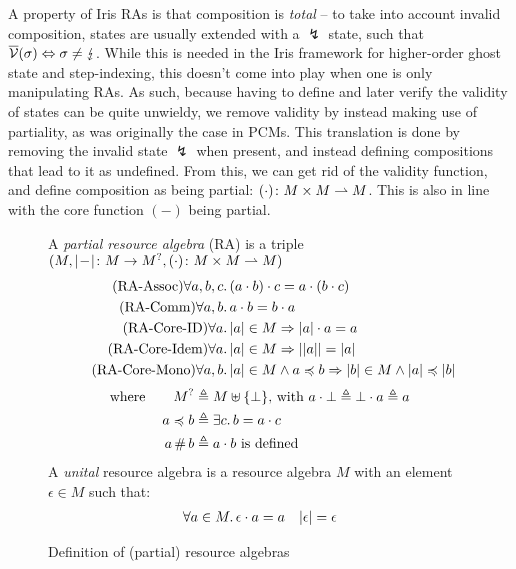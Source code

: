A property of Iris RAs is that composition is \emph{total} -- to take into account invalid composition, states are usually extended with a $\lightning$ state, such that $\overline{\cal V}(\sigma)\Leftrightarrow \sigma\neq\lightning$. While this is needed in the Iris framework for higher-order ghost state and step-indexing, this doesn't come into play when one is only manipulating RAs. As such, because having to define and later verify the validity of states can be quite unwieldy, we remove validity by instead making use of partiality, as was originally the case in PCMs. This translation is done by removing the invalid state $\lightning$ when present, and instead defining compositions that lead to it as undefined. From this, we can get rid of the validity function, and define composition as being partial: $(\cdot)\colon M\times M\rightharpoonup M$. This is also in line with the core function $(-)$ being partial.

\begin{figure}
A \emph{partial resource algebra} (RA) is a triple $(M, |\!-\!|\colon M\rightarrow M^?, (\cdot)\colon M\times M \rightharpoonup M)$
\begin{align}
	\tag{RA-Assoc} \forall a,b,c&\ldotp (a\cdot b)\cdot c = a\cdot (b\cdot c)\\
	\tag{RA-Comm} \forall a,b&\ldotp a\cdot b = b\cdot a\\
	\tag{RA-Core-ID} \forall a&\ldotp |a| \in M \Rightarrow |a|\cdot a = a\\
	\tag{RA-Core-Idem} \forall a&\ldotp |a|\in M\Rightarrow ||a|| = |a|\\
	\tag{RA-Core-Mono} \forall a,b&\ldotp |a|\in M\land a\preccurlyeq b \Rightarrow |b| \in M \land |a| \preccurlyeq |b|
\end{align}
\begin{align*}
	\text{where}\qquad
	M^? &\triangleq M \uplus \{\bot\}\text{, with }a\cdot \bot \triangleq \bot\cdot a\triangleq a\\
	a \preccurlyeq b &\triangleq \exists c\ldotp b = a\cdot c\\
	a\operatorname{\#} b &\triangleq a \cdot b \text{ is defined}
\end{align*}
A \emph{unital} resource algebra is a resource algebra $M$ with an element $\epsilon\in M$ such that:
\begin{align*}
	\forall a\in M\ldotp \epsilon\cdot a = a&&
	|\epsilon|=\epsilon
\end{align*}
\caption{Definition of (partial) resource algebras}
\label{fig:ra-properties}
\end{figure}

